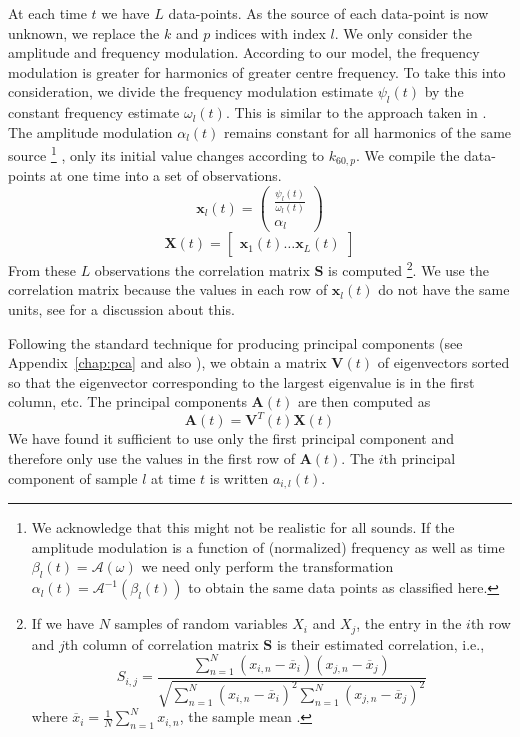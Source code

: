 At each time $t$ we have $L$ data-points. As the source of each data-point is
now unknown, we replace the $k$ and $p$ indices with index $l$. We only consider
the amplitude and frequency modulation. According to our model, the frequency
modulation is greater for harmonics of greater centre frequency. To take this
into consideration, we divide the frequency modulation estimate $\psi_{l}(t)$ by
the constant frequency estimate $\omega_{l}(t)$. This is similar to the approach
taken in \cite{creager2016musicalsource}. The amplitude modulation $\alpha_{l}(t)$
remains constant for all harmonics of the same source%
\footnote{We acknowledge that this might not be realistic
for all sounds. If the amplitude modulation is a function of (normalized) frequency as well
as time $\beta_{l}(t)=\mathcal{A}(\omega)$ we need only perform the
transformation $\alpha_{l}(t)=\mathcal{A}^{-1}(\beta_{l}(t))$ to obtain the same
data points as classified here.}%
, only its initial value
changes according to $k_{60,p}$.
 We compile the data-points at one time
into a
set of observations.
\[
    \mathbf{x}_{l}(t) = \begin{pmatrix}
        \frac{\psi_{l}(t)}{\omega_{l}(t)} \\
        \alpha_{l}
    \end{pmatrix}
\]
\[
    \mathbf{X}(t) = \begin{bmatrix}
        \mathbf{x}_{1}(t) \ldots \mathbf{x}_{L}(t)
    \end{bmatrix}
\]
From these $L$ observations the correlation matrix $\mathbf{S}$ is
computed%
\footnote{If we have $N$ samples of random variables $X_{i}$ and $X_{j}$, the
    entry in the $i$th row and $j$th column of correlation matrix $\boldsymbol{S}$ is their
    estimated correlation, i.e.,
    \[
        S_{i,j}=\frac{\sum_{n=1}^{N}(x_{i,n}-\overline{x}_{i})(x_{j,n}-\overline{x}_{j})}
        {\sqrt{\sum_{n=1}^{N}(x_{i,n}-\overline{x}_{i})^{2}\sum_{n=1}^{N}(x_{j,n}-\overline{x}_{j})^{2}}}
    \]
    where $\overline{x}_{i}=\frac{1}{N}\sum_{n=1}^{N}x_{i,n}$, the sample mean
    \cite[p.~66]{hayes2009statistical}.
}. We use the correlation matrix because the values in each row of $\mathbf{x}_{l}(t)$
do not have the same units, see \cite[p.~22]{jolliffe2002principal} for a
discussion about this. 

Following the standard technique for producing principal components (see
Appendix~\ref{chap:pca} and also \cite[p.~11]{jolliffe2002principal}), we obtain
a matrix $\mathbf{V}(t)$ of eigenvectors sorted so that the eigenvector
corresponding to the largest eigenvalue is in the first column, etc.  The
principal components $\mathbf{A}(t)$ are then computed as
\[
    \mathbf{A}(t) = \mathbf{V}^{T}(t)\mathbf{X}(t)
\]
We have found it sufficient to use only the first principal component and
therefore only use the values in the first row of $\mathbf{A}(t)$. The $i$th
principal component of sample $l$ at time $t$ is written $a_{i,l}(t)$.

